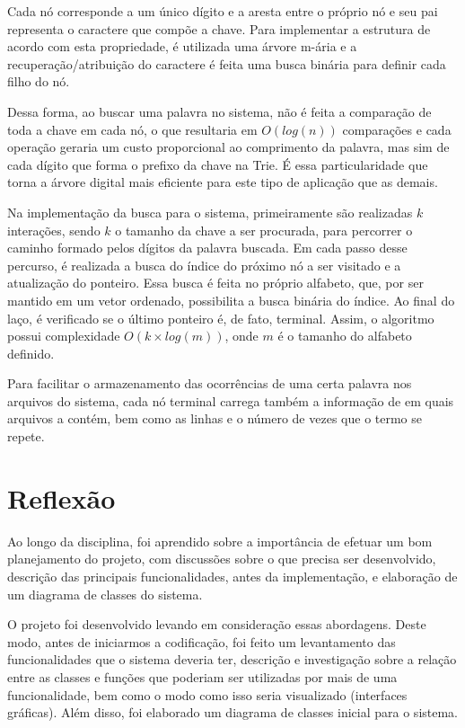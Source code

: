 \documentclass[12pt]{article}
\begin{document}
Cada nó corresponde a um único dígito e a aresta entre o próprio nó e seu pai representa o caractere que compõe a chave. Para implementar a estrutura de acordo com esta propriedade, é utilizada uma árvore m-ária e a recuperação/atribuição do caractere é feita uma busca binária para definir cada filho do nó.

Dessa forma, ao buscar uma palavra no sistema, não é feita a comparação de toda a chave em cada nó, o que resultaria em $O(log(n))$ comparações e cada operação geraria um custo proporcional ao comprimento da palavra, mas sim de cada dígito que forma o prefixo da chave na Trie. É essa particularidade que torna a árvore digital mais eficiente para este tipo de aplicação que as demais.

Na implementação da busca para o sistema, primeiramente são realizadas $k$ interações, sendo $k$ o tamanho da chave a ser procurada, para percorrer o caminho formado pelos dígitos da palavra buscada. Em cada passo desse percurso, é realizada a busca do índice do próximo nó a ser visitado e a atualização do ponteiro. Essa busca é feita no próprio alfabeto, que, por ser mantido em um vetor ordenado, possibilita a busca binária do índice. Ao final do laço, é verificado se o último ponteiro é, de fato, terminal. Assim, o algoritmo possui complexidade $O(k\times log(m))$, onde $m$ é o tamanho do alfabeto definido.

Para facilitar o armazenamento das ocorrências de uma certa palavra nos arquivos do sistema, cada nó terminal carrega também a informação de em quais arquivos a contém, bem como as linhas e o número de vezes que o termo se repete.


\section{Reflexão}
Ao longo da disciplina, foi aprendido sobre a importância de efetuar um bom planejamento do projeto, com discussões sobre o que precisa ser desenvolvido, descrição das principais funcionalidades, antes da implementação, e elaboração de um diagrama de classes do sistema.

O projeto foi desenvolvido levando em consideração essas abordagens. Deste modo, antes de iniciarmos a codificação, foi feito um levantamento das funcionalidades que o sistema deveria ter, descrição e investigação sobre a relação entre as classes e funções que poderiam ser utilizadas por mais de uma funcionalidade, bem como o modo como isso seria visualizado (interfaces gráficas). Além disso, foi elaborado um diagrama de classes inicial para o sistema.
\end{document}
